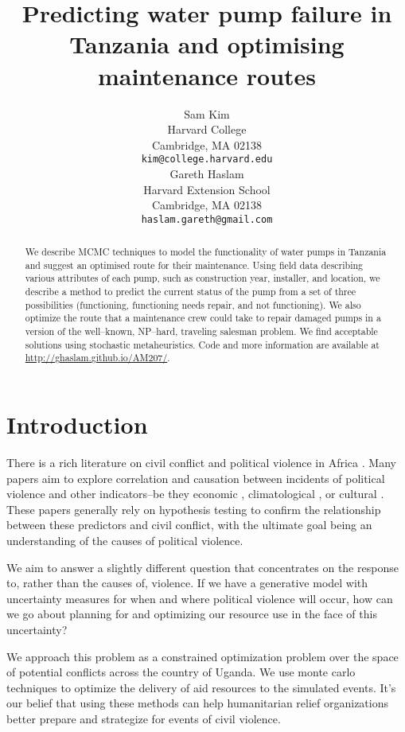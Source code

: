 \documentclass{article} %
\title{Predicting water pump failure in Tanzania and optimising maintenance routes}
\author{
Sam Kim \\
Harvard College\\
Cambridge, MA 02138 \\
\texttt{kim@college.harvard.edu} \\
\And
Gareth Haslam \\
Harvard Extension School\\
Cambridge, MA 02138 \\
\texttt{haslam.gareth@gmail.com} \\
}
\begin{document}
\maketitle

\begin{abstract}
We describe MCMC techniques to model the functionality of water pumps in Tanzania and suggest an optimised route for their maintenance. Using field data describing various attributes of each pump, such as construction year, installer, and location, we describe a method to predict the current status of the pump from a set of three possibilities (functioning, functioning needs repair, and not functioning). We also optimize the route that a maintenance crew could take to repair damaged pumps in a version of the well--known, NP--hard, traveling salesman problem. We find acceptable solutions using stochastic metaheuristics. Code and more information are available at \url{http://ghaslam.github.io/AM207/}.
\end{abstract}
\section{Introduction}

There is a rich literature on civil conflict and political violence in Africa \cite{collier2002incidence}. Many papers aim to explore correlation and causation between incidents of political violence and other indicators--be they economic \cite{buhaug2006local}, climatological \cite{hendrix2012climate}, or cultural \cite{van1999temperature}. These papers generally rely on hypothesis testing to confirm the relationship between these predictors and civil conflict, with the ultimate goal being an understanding of the causes of political violence.

We aim to answer a slightly different question that concentrates on the response to, rather than the causes of, violence. If we have a generative model with uncertainty measures for when and where political violence will occur, how can we go about planning for and optimizing our resource use in the face of this uncertainty?

We approach this problem as a constrained optimization problem over the space of potential conflicts across the country of Uganda. We use monte carlo techniques to optimize the delivery of aid resources to the simulated events. It's our belief that using these methods can help humanitarian relief organizations better prepare and strategize for events of civil violence.
\end{document}
